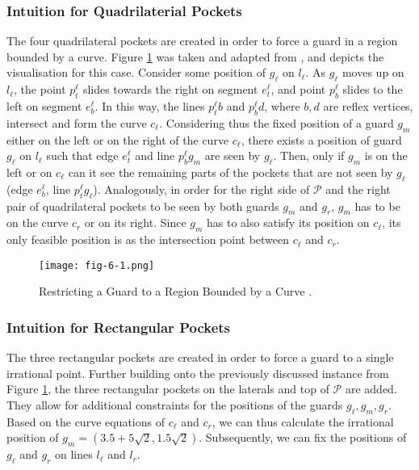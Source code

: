 \subsubsection{Intuition for Quadrilaterial Pockets}
The four quadrilateral pockets are created in order to force a guard in a region bounded by a curve. Figure \ref{fig:quadrilateral_pockets} was taken and adapted from \cite{1057165}, and depicts the visualisation for this case. 
Consider some position of $g_{\ell}$ on $l_{\ell}$. As $g_{\ell}$ moves up on $l_{\ell}$, the point $p^{\ell}_t$ slides towards the right on segment $e^{\ell}_t$, and point $p^{\ell}_b$ slides to the left on segment $e^{\ell}_b$. In this way, the lines $p^{\ell}_tb$ and $p^{\ell}_bd$, where $b, d$ are reflex vertices, intersect and form the curve $c_{\ell}$. Considering thus the fixed position of a guard $g_m$ either on the left or on the right of the curve $c_\ell$, there exists a position of guard $g_{\ell}$ on $l_{\ell}$ such that edge $e_t^{\ell}$ and line $p_b^{\ell}g_m$ are seen by $g_\ell$. Then, only if $g_m$ is on the left or on $c_\ell$ can it see the remaining parts of the pockets that are not seen by $g_\ell$ (edge $e_b^{\ell}$, line $p_t^{\ell}g_{\ell}$). Analogously, in order for the right side of $\mathcal P$ and the right pair of quadrilateral pockets to be seen by both guards $g_m$ and $g_r$, $g_m$ has to be on the curve $c_r$ or on its right. Since $g_m$ has to also satisfy its position on $c_\ell$, its only feasible position is as the intersection point between $c_\ell$ and $c_r$. 

\begin{figure}[h!]
    \centering
    \texttt{[image: fig-6-1.png]}
    \caption{Restricting a Guard to a Region Bounded by a Curve \cite{1057165}.}
    \label{fig:quadrilateral_pockets}
\end{figure}

\subsubsection{Intuition for Rectangular Pockets}
The three rectangular pockets are created in order to force a guard to a single irrational point. Further building onto the previously discussed instance from Figure \ref{fig:quadrilateral_pockets}, the three rectangular pockets on the laterals and top of $\mathcal P$ are added.  They allow for additional constraints for the positions of the guards $g_\ell, g_m, g_r$. Based on the curve equations of $c_\ell$ and $c_r$, we can thus calculate the irrational position of $g_m = (3.5 + 5\sqrt 2, 1.5\sqrt 2)$. Subsequently, we can fix the positions of $g_\ell$ and $g_r$ on lines $l_\ell$ and $l_r$.

